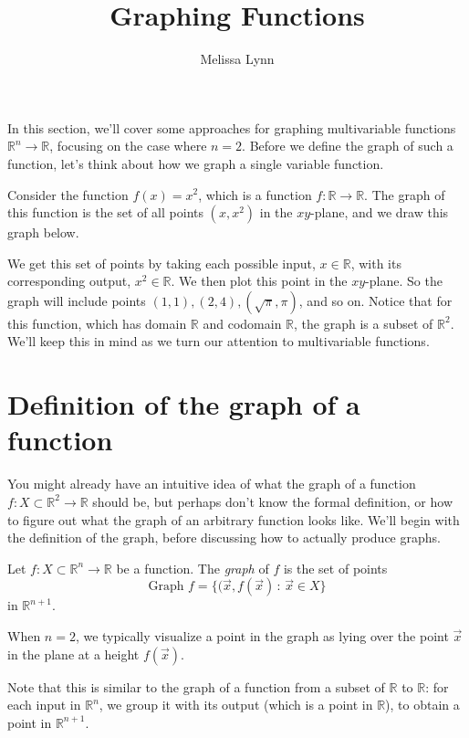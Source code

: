 \documentclass{ximera}
\title{Graphing Functions}
\author{Melissa Lynn}
\begin{document}
\begin{abstract}
\end{abstract}
\maketitle

In this section, we'll cover some approaches for graphing multivariable functions $\mathbb{R}^n\rightarrow\mathbb{R}$, focusing on the case where $n=2$. Before we define the graph of such a function, let's think about how we graph a single variable function.

Consider the function $f(x) = x^2$, which is a function $f:\mathbb{R}\rightarrow\mathbb{R}$. The graph of this function is the set of all points $(x,x^2)$ in the $xy$-plane, and we draw this graph below.


We get this set of points by taking each possible input, $x\in\mathbb{R}$, with its corresponding output, $x^2\in\mathbb{R}$. We then plot this point in the $xy$-plane. So the graph will include points $(1,1), (2,4), (\sqrt{\pi}, \pi)$, and so on. Notice that for this function, which has domain $\mathbb{R}$ and codomain $\mathbb{R}$, the graph is a subset of $\mathbb{R}^2$. We'll keep this in mind as we turn our attention to multivariable functions.

\section*{Definition of the graph of a function}

You might already have an intuitive idea of what the graph of a function $f:X\subset\mathbb{R}^2\rightarrow\mathbb{R}$ should be, but perhaps don't know the formal definition, or how to figure out what the graph of an arbitrary function looks like. We'll begin with the definition of the graph, before discussing how to actually produce graphs.

\begin{definition}
Let $f:X\subset\mathbb{R}^n\rightarrow\mathbb{R}$ be a function. The \emph{graph} of $f$ is the set of points
\[
\textrm{Graph }f = \{(\vec{x},f(\vec{x})\,:\,\vec{x}\in X\}
\]
in $\mathbb{R}^{n+1}$.

When $n=2$, we typically visualize a point in the graph as lying over the point $\vec{x}$ in the plane at a height $f(\vec{x})$.
\end{definition}

Note that this is similar to the graph of a function from a subset of $\mathbb{R}$ to $\mathbb{R}$: for each input in $\mathbb{R}^n$, we group it with its output (which is a point in $\mathbb{R}$), to obtain a point in $\mathbb{R}^{n+1}$.
\end{document}
